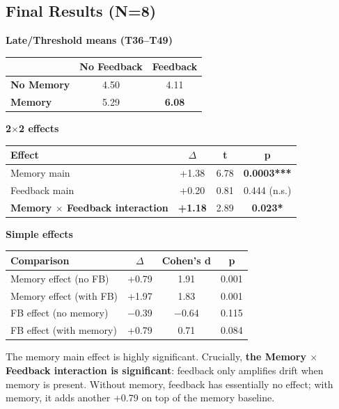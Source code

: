 \documentclass[11pt]{article}
\begin{document}
\subsection{Final Results (N=8)}

\noindent \textbf{Late/Threshold means (T36--T49)}

\begin{table}[h]
\centering
\begin{tabular}{lcc}
\toprule
 & No Feedback & Feedback \\
\midrule
\textbf{No Memory} & 4.50 & 4.11 \\
\textbf{Memory} & 5.29 & \textbf{6.08} \\
\bottomrule
\end{tabular}
\end{table}

\noindent \textbf{2$\times$2 effects}

\begin{table}[h]
\centering
\begin{tabular}{lccc}
\toprule
Effect & $\Delta$ & t & p \\
\midrule
Memory main & +1.38 & 6.78 & \textbf{0.0003***} \\
Feedback main & +0.20 & 0.81 & 0.444 (n.s.) \\
\textbf{Memory $\times$ Feedback interaction} & \textbf{+1.18} & 2.89 & \textbf{0.023*} \\
\bottomrule
\end{tabular}
\end{table}

\noindent \textbf{Simple effects}

\begin{table}[h]
\centering
\begin{tabular}{lccc}
\toprule
Comparison & $\Delta$ & Cohen's d & p \\
\midrule
Memory effect (no FB) & +0.79 & 1.91 & 0.001 \\
Memory effect (with FB) & +1.97 & 1.83 & 0.001 \\
FB effect (no memory) & $-$0.39 & $-$0.64 & 0.115 \\
FB effect (with memory) & +0.79 & 0.71 & 0.084 \\
\bottomrule
\end{tabular}
\end{table}

The memory main effect is highly significant. Crucially, \textbf{the Memory $\times$ Feedback interaction is significant}: feedback only amplifies drift when memory is present. Without memory, feedback has essentially no effect; with memory, it adds another +0.79 on top of the memory baseline.
\end{document}
